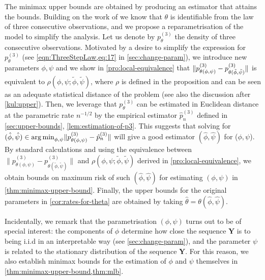\documentclass[journal]{IEEEtran}
\newcommand{\1}{\boldsymbol{1}}
\DeclareMathOperator*{\argmin}{arg\,min}
\DeclarePairedDelimiter{\norm}{\lVert}{\rVert}
\begin{document}
	The minimax upper bounds are obtained by producing an estimator that attains
	the bounds. Building on the work of \cite{AGHKT14,MR3439359} we know that $\theta$ is
	identifiable from 
	the law of three consecutive observations, and we propose a reparametrisation of the model  to simplify the analysis. Let us denote by $p_{\theta}^{(3)}$ the density of  three consecutive observations.
	Motivated by a desire to simplify the expression for $p_{\theta}^{(3)}$ (see
	\cref{eqn:ThreeStepLaw,eq:17} in
	\cref{sec:change-param}), we introduce new parameters $\phi,\psi$ and we show in \cref{pro:local-equivalence} that
	$\norm{p_{\theta(\phi,\psi)}^{(3)} - p_{\theta(\tilde{\phi},\tilde{\psi})}^{(3)}}$ is equivalent to
	$\rho(\phi,\psi;\tilde{\phi},\tilde{\psi})$, where $\rho$ is defined in the proposition and can be
	seen as %
	an adequate statistical distance of the problem (see also the discussion after \cref{kul:upper}). Then, we leverage that $p_{\theta}^{(3)}$ can be estimated in
	Euclidean distance at the parametric rate $n^{-1/2}$ by the empirical estimator
	$\hat{p}_n^{(3)}$ defined in \cref{sec:upper-bounds},
	\cref{lem:estimation-of-p3}. This suggests that solving for
	$(\hat{\phi},\hat{\psi}) \in \argmin_{\phi,\psi} \norm{p_{\theta(\phi,\psi)}^{(3)} - \hat{p}_n^{(3)}}$ will give a good estimator $(\hat{\phi},\hat{\psi})$ for ($\phi,\psi$). By
	standard calculations and using the equivalence between
	$\|p_{\theta(\phi,\psi)}^{(3)} - p_{\theta(\tilde{\phi},\tilde{\psi})}^{(3)}\|$ and
	$\rho(\phi,\psi;\tilde{\phi},\tilde{\psi})$ derived in \cref{pro:local-equivalence}, we obtain bounds on maximum risk of such $(\hat{\phi},\hat{\psi})$ for estimating
	$(\phi,\psi)$ in \cref{thm:minimax-upper-bound}. Finally, the upper bounds for the original parameters in \cref{cor:rates-for-theta} are obtained by taking
	$\hat{\theta} = \theta(\hat{\phi},\hat{\psi})$.

	Incidentally, we remark that the
	parametrisation $(\phi,\psi)$ turns out to be of special interest: the
	components of $\phi$ determine how close the sequence $\bm{Y}$ is to being
	i.i.d in an interpretable way (see \cref{sec:change-param}), and the
	parameter $\psi$ is related to the stationary distribution of the sequence
	$\bm{Y}$. For this reason, we also establish minimax bounds for the
	estimation of $\phi$ and $\psi$ themselves in \cref{thm:minimax-upper-bound,thm:mlb}. %
\end{document}
